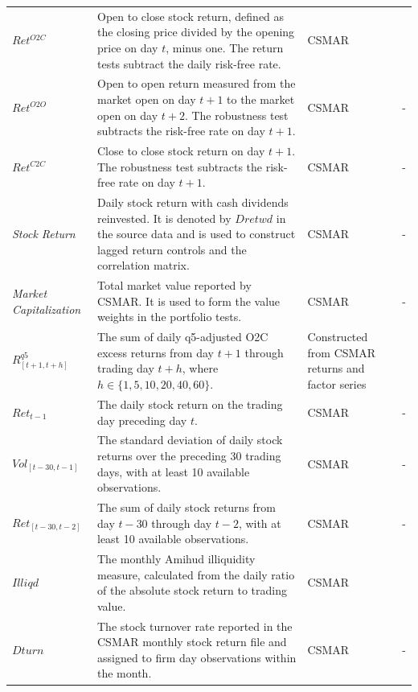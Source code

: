 \documentclass[12pt]{article}
\begin{document}
\begin{xltabular}{\textwidth}{@{} >{\RaggedRight\arraybackslash}p{3.1cm} >{\RaggedRight\arraybackslash}X >{\RaggedRight\arraybackslash}p{2.6cm} >{\RaggedRight\arraybackslash}p{2.8cm} @{}}
   \\
  \midrule

  $Ret^{O2C}$ & Open to close stock return, defined as the closing price divided by the opening price on day $t$, minus one. The return tests subtract the daily risk-free rate. & CSMAR & \cite{lopez2023chatgpt} \\
  \addlinespace
  $Ret^{O2O}$ & Open to open return measured from the market open on day $t+1$ to the market open on day $t+2$. The robustness test subtracts the risk-free rate on day $t+1$. & CSMAR & - \\
  \addlinespace
  $Ret^{C2C}$ & Close to close stock return on day $t+1$. The robustness test subtracts the risk-free rate on day $t+1$. & CSMAR & - \\
  \addlinespace
  \textit{Stock Return} & Daily stock return with cash dividends reinvested. It is denoted by $Dretwd$ in the source data and is used to construct lagged return controls and the correlation matrix. & CSMAR & - \\
  \addlinespace
  \textit{Market Capitalization} & Total market value reported by CSMAR. It is used to form the value weights in the portfolio tests. & CSMAR & - \\
  \addlinespace
  $R^{q5}_{[t+1,t+h]}$ & The sum of daily q5-adjusted O2C excess returns from day $t+1$ through trading day $t+h$, where $h\in\{1,5,10,20,40,60\}$. & Constructed from CSMAR returns and factor series & \cite{hou2021} \\
  \addlinespace
  $Ret_{t-1}$ & The daily stock return on the trading day preceding day $t$. & CSMAR & - \\
  \addlinespace
  $Vol_{[t-30,t-1]}$ & The standard deviation of daily stock returns over the preceding 30 trading days, with at least 10 available observations. & CSMAR & - \\
  \addlinespace
  $Ret_{[t-30,t-2]}$ & The sum of daily stock returns from day $t-30$ through day $t-2$, with at least 10 available observations. & CSMAR & - \\
  \addlinespace
  $Illiqd$ & The monthly Amihud illiquidity measure, calculated from the daily ratio of the absolute stock return to trading value. & CSMAR & \cite{amihud2002illiquidity} \\
  \addlinespace
  $Dturn$ & The stock turnover rate reported in the CSMAR monthly stock return file and assigned to firm day observations within the month. & CSMAR & - \\

\end{xltabular}
\end{document}
